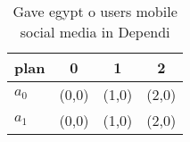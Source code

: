\documentclass[a4paper]{article}
\begin{document}
\begin{table}
\begin{adjustbox}{width=0.6\columnwidth}
\begin{tabular}{|l|l|l|l|}
\hline
\textbf{plan} & \multicolumn{1}{c|}{\textbf{0}} & \multicolumn{1}{c|}{\textbf{1}} & \multicolumn{1}{c|}{\textbf{2}} \\ \hline
\textbf{$a_0$}  & (0,0) & (1,0) & (2,0) \\ \hline
\textbf{$a_1$}  & (0,0) & (1,0) & (2,0) \\ \hline
\end{tabular}
\end{adjustbox}
\caption{Gave egypt o users mobile social media in Dependi
}
\end{table}
\end{document}
